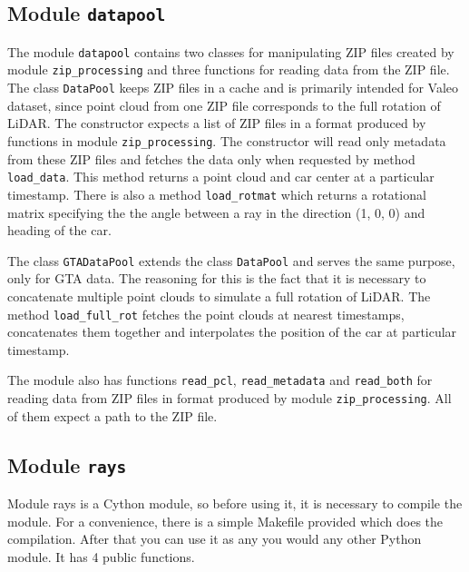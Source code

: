 \subsection{Module \texttt{datapool}}
The module \texttt{datapool} contains two classes for manipulating ZIP files created by module \texttt{zip\_processing} and three functions for reading data from the ZIP file. The class \texttt{DataPool} keeps ZIP files in a cache and is primarily intended for Valeo dataset, since point cloud from one ZIP file corresponds to the full rotation of LiDAR. The constructor expects a list of ZIP files in a format produced by functions in module \texttt{zip\_processing}. The constructor will read only metadata from these ZIP files and fetches the data only when requested by method \texttt{load\_data}. This method returns a point cloud and car center at a particular timestamp. There is also a method \texttt{load\_rotmat} which returns a rotational matrix specifying the the angle between a ray in the direction (1, 0, 0) and heading of the car.

The class \texttt{GTADataPool} extends the class \texttt{DataPool} and serves the same purpose, only for GTA data. The reasoning for this is the fact that it is necessary to concatenate multiple point clouds to simulate a full rotation of LiDAR. The method \texttt{load\_full\_rot} fetches the point clouds at nearest timestamps, concatenates them together and interpolates the position of the car at particular timestamp.

The module also has functions \texttt{read\_pcl}, \texttt{read\_metadata} and \texttt{read\_both} for reading data from ZIP files in format produced by module \texttt{zip\_processing}. All of them expect a path to the ZIP file.

\subsection{Module \texttt{rays}}
Module rays is a Cython module, so before using it, it is necessary to compile the module. For a convenience, there is a simple Makefile provided which does the compilation. After that you can use it as any you would any other Python module. It has 4 public functions.

